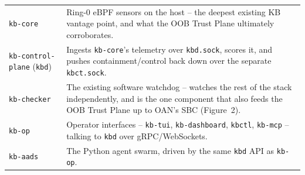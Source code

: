 \documentclass[11pt,a4paper]{article}
\begin{document}
\begin{center}
\begin{tabular}{@{}p{3.6cm}p{10.6cm}@{}}
\texttt{kb-core} & Ring-0 eBPF sensors on the host -- the deepest existing KB vantage point, and what the OOB Trust Plane ultimately corroborates. \\
\texttt{kb-control-plane} (\texttt{kbd}) & Ingests \texttt{kb-core}'s telemetry over \texttt{kbd.sock}, scores it, and pushes containment/control back down over the separate \texttt{kbct.sock}. \\
\texttt{kb-checker} & The existing software watchdog -- watches the rest of the stack independently, and is the one component that also feeds the OOB Trust Plane up to OAN's SBC (Figure~2). \\
\texttt{kb-op} & Operator interfaces -- \texttt{kb-tui}, \texttt{kb-dashboard}, \texttt{kbctl}, \texttt{kb-mcp} -- talking to \texttt{kbd} over gRPC/WebSockets. \\
\texttt{kb-aads} & The Python agent swarm, driven by the same \texttt{kbd} API as \texttt{kb-op}. \\
\bottomrule
\end{tabular}
\end{center}
\end{document}
